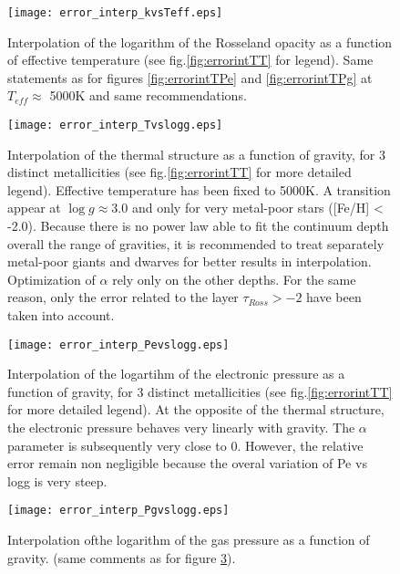 \documentclass[11pt]{article}
\begin{document}
\begin{figure}[h!]
\begin{center}            
\texttt{[image: error\_interp\_kvsTeff.eps]}
\caption{Interpolation of the logarithm of the Rosseland  opacity as a function of effective temperature (see fig.\ref{fig:errorintTT} for legend). Same statements as for figures \ref{fig:errorintTPe} and \ref{fig:errorintTPg} at $T_{eff} \approx $ 5000K and same recommendations. }\label{fig:errorintTk}
\end{center}
\end{figure}

\begin{figure}[h!]
\begin{center}
\texttt{[image: error\_interp\_Tvslogg.eps]}
\caption{Interpolation of the thermal structure as a function of gravity, for 3 distinct metallicities (see fig.\ref{fig:errorintTT} for more detailed legend). Effective temperature has been fixed to 5000K. A transition appear at $\log g \approx 3.0$ and only for very metal-poor stars ([Fe/H] < -2.0). Because there is no power law able to fit the continuum depth overall the range of gravities, it is recommended to treat separately metal-poor giants and dwarves for better results in interpolation.  Optimization of $\alpha$ rely only on the other depths. For the same reason, only the error related to the layer $\tau_{Ross} > -2$ have been taken into account.}\label{fig:errorintgT}
\end{center}
\end{figure}

\begin{figure}[h!]
\begin{center}            
\texttt{[image: error\_interp\_Pevslogg.eps]}
\caption{Interpolation of the logartihm of the electronic pressure as a function of gravity, for 3 distinct metallicities (see fig.\ref{fig:errorintTT} for more detailed legend). At the opposite of the thermal structure, the electronic pressure behaves very linearly with gravity. The $\alpha$ parameter is subsequently very close to 0. However, the relative error remain non negligible because the overal variation of Pe vs logg is very steep.}\label{fig:errorintgPe}
\end{center}
\end{figure}
\begin{figure}[h!]

\begin{center}            
\texttt{[image: error\_interp\_Pgvslogg.eps]}
\caption{Interpolation ofthe  logarithm of the gas pressure as a function of gravity. (same comments as for figure \ref{fig:errorintgPe}).}\label{fig:errorintgPg}
\end{center}
\end{figure}
\end{document}
